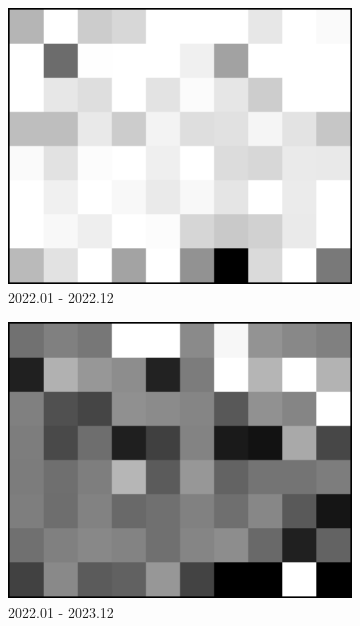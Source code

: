 \documentclass[a4paper,fleqn]{cas-sc}
\begin{document}
\begin{figure}
\begin{subfigure}{0.3\textwidth}
        \includegraphics[width=\textwidth]{figure/The azimuth shift/shift_Milan_asc_20221223.png}
        \caption{2022.01 - 2022.12}
        \label{fig_7b}
    \end{subfigure}
    \begin{subfigure}{0.3\textwidth}
        \centering
        \includegraphics[width=\textwidth]{figure/The azimuth shift/shift_Milan_asc_20231230.png}
        \caption{2022.01 - 2023.12}
        \label{fig_7c}
    \end{subfigure}
    \hfill
    \begin{subfigure}{0.3\textwidth}

\end{subfigure}
\end{figure}
\end{document}
